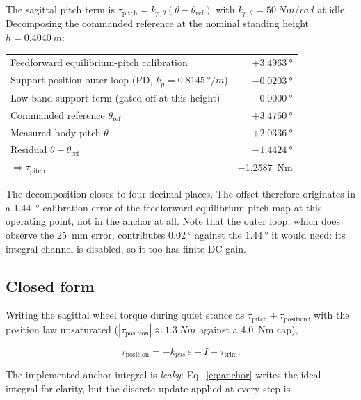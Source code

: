 \documentclass[conference]{IEEEtran}
\begin{document}
The sagittal pitch term is $\tau_{\text{pitch}}=k_{p,\theta}(\theta-\theta_{\text{ref}})$
with $k_{p,\theta}=\SI{50}{Nm/rad}$ at idle. Decomposing the commanded
reference at the nominal standing height $h{=}\SI{0.4040}{m}$:

\begin{center}\footnotesize
\begin{tabular}{lr}
\hline
Feedforward equilibrium-pitch calibration & $+\SI{3.4963}{\degree}$ \\
Support-position outer loop (PD, $k_p{=}\SI{0.8145}{\degree/m}$) & $-\SI{0.0203}{\degree}$ \\
Low-band support term (gated off at this height) & $\phantom{+}\SI{0.0000}{\degree}$ \\
\hline
Commanded reference $\theta_{\text{ref}}$ & $+\SI{3.4760}{\degree}$ \\
Measured body pitch $\theta$ & $+\SI{2.0336}{\degree}$ \\
\hline
Residual $\theta-\theta_{\text{ref}}$ & $-\SI{1.4424}{\degree}$ \\
$\Rightarrow \tau_{\text{pitch}}$ & \SI{-1.2587}{Nm} \\
\hline
\end{tabular}
\end{center}

The decomposition closes to four decimal places. The offset therefore
originates in a \SI{1.44}{\degree} calibration error of the feedforward
equilibrium-pitch map at this operating point, not in the anchor at all. Note
that the outer loop, which does observe the \SI{25}{mm} error, contributes
$\SI{0.02}{\degree}$ against the $\SI{1.44}{\degree}$ it would need: its
integral channel is disabled, so it too has finite DC gain.

\subsection{Closed form}

Writing the sagittal wheel torque during quiet stance as
$\tau_{\text{pitch}}+\tau_{\text{position}}$, with the position law unsaturated
($|\tau_{\text{position}}|\approx\SI{1.3}{Nm}$ against a \SI{4.0}{Nm} cap),

\begin{equation}
\tau_{\text{position}} = -k_{pos}\,e + I + \tau_{\text{trim}}.
\label{eq:poslaw}
\end{equation}

The implemented anchor integral is \emph{leaky}: Eq.~\eqref{eq:anchor} writes
the ideal integral for clarity, but the discrete update applied at every step is
\end{document}
